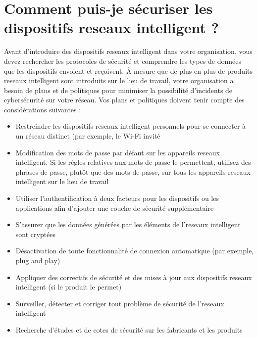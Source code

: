 \documentclass[12pt]{report}
\begin{document}
\hypertarget{comment-puis-je-suxe9curiser-les-dispositifs-reseaux intelligent}{%
      \section{\texorpdfstring{Comment puis-je sécuriser les dispositifs reseaux intelligent ?
        }{Comment puis-je sécuriser les dispositifs reseaux intelligent ? }}\label{comment-puis-je-suxe9curiser-les-dispositifs-reseaux intelligent}}

Avant d'introduire des dispositifs reseaux intelligent dans votre organisation, vous
devez rechercher les protocoles de sécurité et comprendre les types de
données que les dispositifs envoient et reçoivent. À mesure que de plus
en plus de produits reseaux intelligent sont introduits sur le lieu de travail, votre
organisation a besoin de plans et de politiques pour minimiser la
possibilité d'incidents de cybersécurité sur votre réseau. Vos plans et
politiques doivent tenir compte des considérations suivantes :

\begin{itemize}
      \item
            Restreindre les dispositifs reseaux intelligent personnels pour se connecter à un
            réseau distinct (par exemple, le Wi-Fi invité
      \item
            Modification des mots de passe par défaut sur les appareils reseaux intelligent. Si
            les règles relatives aux mots de passe le permettent, utilisez des
            phrases de passe, plutôt que des mots de passe, sur tous les appareils
            reseaux intelligent sur le lieu de travail
      \item
            Utiliser l'authentification à deux facteurs pour les dispositifs ou
            les applications afin d'ajouter une couche de sécurité supplémentaire
      \item
            S'assurer que les données générées par les éléments de l'reseaux intelligent sont
            cryptées
      \item
            Désactivation de toute fonctionnalité de connexion automatique (par
            exemple, plug and play)
      \item
            Appliquer des correctifs de sécurité et des mises à jour aux
            dispositifs reseaux intelligent (si le produit le permet)
      \item
            Surveiller, détecter et corriger tout problème de sécurité de l'reseaux intelligent
      \item
            Recherche d'études et de cotes de sécurité sur les fabricants et les
            produits
\end{itemize}
\end{document}
